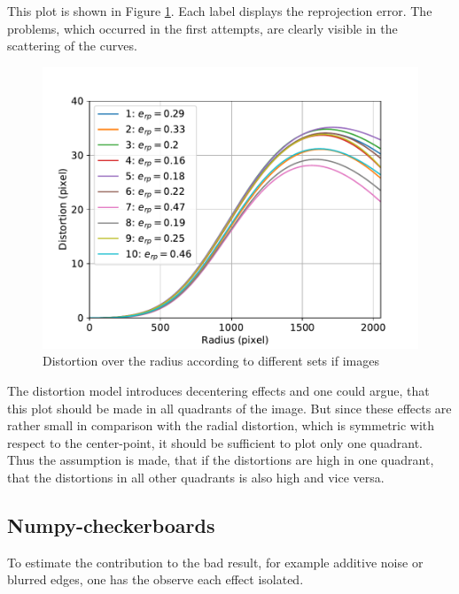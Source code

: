 This plot is shown in Figure \ref{development:stat}.
Each label displays the reprojection error.
The problems, which occurred in the first attempts, are clearly visible in the scattering of the curves.
\begin{figure}[ht]
	\centering
	\includegraphics[width=0.9\linewidth]{3-development/calibration/images/stat.pdf}
	\caption{Distortion over the radius according to different sets if images\label{development:stat}}
\end{figure}
The distortion model introduces decentering effects and one could argue, that this plot should be made in all quadrants of the image.
But since these effects are rather small in comparison with the radial distortion, which is symmetric with respect to the center-point, it should be sufficient to plot only one quadrant.
Thus the assumption is made, that if the distortions are high in one quadrant, that the distortions in all other quadrants is also high and vice versa.

\newpage
\subsection{Numpy-checkerboards\label{development:checker}}  
To estimate the contribution to the bad result, for example additive noise or blurred edges, one has the observe each effect isolated.


